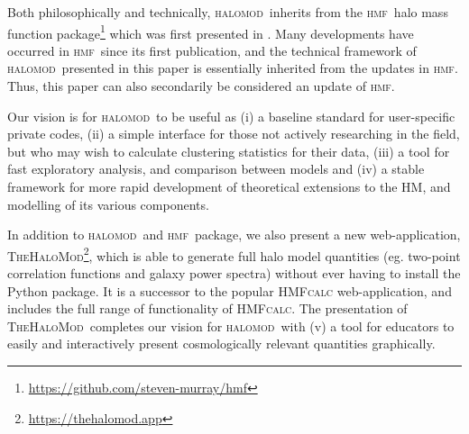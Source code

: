 \documentclass[5p,aas_macros]{elsarticle}
\newcommand{\halomod}{\textsc{halomod}}
\newcommand{\thm}{\textsc{TheHaloMod}}
\newcommand{\hmf}{\textsc{hmf}}
\newcommand{\bd}[1]{\textcolor{purple}{\textbf{[BD: #1]}}}
\begin{document}
Both philosophically and technically, \halomod\ inherits from the \hmf\ halo mass function package\footnote{\url{https://github.com/steven-murray/hmf}} which was first presented in \cite{Murray2013a}.
Many developments have occurred in \hmf\ since its first publication, and the technical framework of \halomod\ presented in this paper is essentially inherited from the updates in \hmf. 
Thus, this paper can also secondarily be considered an update of \hmf.

Our vision is for \halomod\  to be useful as 
(i) a baseline standard for user-specific private codes, 
(ii) a simple interface for those not actively researching in the field, but who may wish to calculate clustering statistics for their data, 
(iii) a tool for fast exploratory analysis, and comparison between models and 
(iv) a stable framework for more rapid development of theoretical extensions to the HM, and modelling of its various components. 



In addition to \halomod\ and \hmf\ package, we also present a new web-application, \thm\footnote{\url{ https://thehalomod.app}}, which is able to generate full halo model quantities (eg. two-point correlation functions and galaxy power spectra) without ever having to install the Python package.
It is a successor to the popular \textsc{HMFcalc} \citep{Murray2013a} web-application, and includes the full range of functionality of \textsc{HMFcalc}.
The presentation of \thm\ completes our vision for \halomod\ with (v) a tool for educators to easily and interactively present cosmologically relevant quantities graphically.
\end{document}
